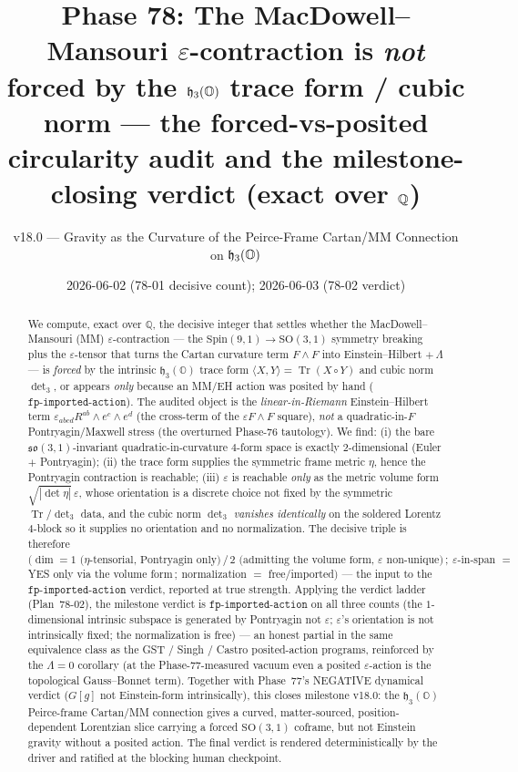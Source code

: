 \documentclass[11pt]{article}
\title{Phase 78: The MacDowell--Mansouri $\varepsilon$-contraction is \emph{not}
forced by the $\hh_3(\OO)$ trace form / cubic norm --- the forced-vs-posited
circularity audit and the milestone-closing verdict (exact over $\Q$)}
\author{v18.0 --- Gravity as the Curvature of the Peirce-Frame Cartan/MM Connection on $\hh_3(\OO)$}
\date{2026-06-02 (78-01 decisive count); 2026-06-03 (78-02 verdict)}
\newcommand{\Q}{\mathbb{Q}}
\newcommand{\OO}{\mathbb{O}}
\newcommand{\eu}{e}
\newcommand{\Tr}{\operatorname{Tr}}
\newcommand{\so}{\mathfrak{so}}
\newcommand{\hh}{\mathfrak{h}}
\theoremstyle{definition}\newtheorem{remark}{Remark}
\theoremstyle{definition}\newtheorem{definition}{Definition}
\theoremstyle{plain}\newtheorem{proposition}{Proposition}
\theoremstyle{plain}\newtheorem{lemma}{Lemma}
\begin{document}
\maketitle

\begin{abstract}
We compute, exact over $\Q$, the decisive integer that settles whether the
MacDowell--Mansouri (MM) $\varepsilon$-contraction --- the $\mathrm{Spin}(9,1)\to
\mathrm{SO}(3,1)$ symmetry breaking plus the $\varepsilon$-tensor that turns the
Cartan curvature term $F\wedge F$ into Einstein--Hilbert $+\,\Lambda$ --- is
\emph{forced} by the intrinsic $\hh_3(\OO)$ trace form $\langle X,Y\rangle=\Tr(X\circ
Y)$ and cubic norm $\det\nolimits_3$, or appears \emph{only} because an MM/EH action
was posited by hand ($\texttt{fp-imported-action}$). The audited object is the
\emph{linear-in-Riemann} Einstein--Hilbert term
$\varepsilon_{abcd}R^{ab}\wedge \eu^c\wedge \eu^d$ (the cross-term of the
$\varepsilon F\wedge F$ square), \emph{not} a quadratic-in-$F$ Pontryagin/Maxwell
stress (the overturned Phase-76 tautology). We find: (i) the bare
$\so(3,1)$-invariant quadratic-in-curvature $4$-form space is exactly
$2$-dimensional (Euler $+$ Pontryagin); (ii) the trace form supplies the symmetric
frame metric $\eta$, hence the Pontryagin contraction is reachable; (iii)
$\varepsilon$ is reachable \emph{only} as the metric volume form $\sqrt{|\det\eta|}\,
\varepsilon$, whose orientation is a discrete choice not fixed by the symmetric
$\Tr/\det\nolimits_3$ data, and the cubic norm $\det\nolimits_3$ \emph{vanishes
identically} on the soldered Lorentz $4$-block so it supplies no orientation and no
normalization. The decisive triple is therefore
$\bigl(\dim=1\text{ (}\eta\text{-tensorial, Pontryagin only)}\,/\,2\text{ (admitting
the volume form, }\varepsilon\text{ non-unique})\,;\ \varepsilon\text{-in-span }=\,$
YES only via the volume form$\,;\ \text{normalization }=$ free/imported$\bigr)$ ---
the input to the $\texttt{fp-imported-action}$ verdict, reported at true strength.
Applying the verdict ladder (Plan~78-02), the milestone verdict is
$\texttt{fp-imported-action}$ on all three counts (the $1$-dimensional intrinsic
subspace is generated by Pontryagin not $\varepsilon$; $\varepsilon$'s orientation is
not intrinsically fixed; the normalization is free) --- an honest partial in the same
equivalence class as the GST / Singh / Castro posited-action programs, reinforced by the
$\Lambda=0$ corollary (at the Phase-77-measured vacuum even a posited
$\varepsilon$-action is the topological Gauss--Bonnet term). Together with Phase~77's
NEGATIVE dynamical verdict ($G[g]$ not Einstein-form intrinsically), this closes
milestone v18.0: the $\hh_3(\OO)$ Peirce-frame Cartan/MM connection gives a curved,
matter-sourced, position-dependent Lorentzian slice carrying a forced
$\mathrm{SO}(3,1)$ coframe, but not Einstein gravity without a posited action. The
final verdict is rendered deterministically by the driver and ratified at the blocking
human checkpoint.
\end{abstract}
\end{document}
